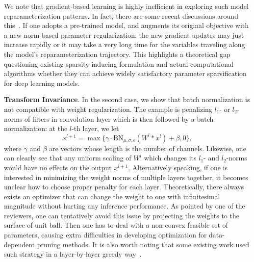 \documentclass{article} %
\begin{document}
We note that gradient-based learning is highly inefficient in exploring such model reparameterization 
patterns. In fact, there are some recent discussions around this~\citep{dinh2017sharp}. If one adopts a pre-trained model, and augments
its original objective with a new norm-based parameter regularization, the new gradient updates may just increase rapidly or 
it may take a very long time for the variables traveling along the model's reparameterization trajectory. 
This highlights a theoretical gap questioning existing sparsity-inducing formulation and actual
computational algorithms whether they can achieve widely satisfactory parameter sparsification
for deep learning models. 

\textbf{Transform Invariance}.
In the second case, we show that batch normalization is not compatible with weight regularization.
The example is penalizing
$l_1$- or $l_2$-norms of filters in convolution layer which is then followed by a batch normalization:
at the $l$-th layer, we let
\[x^{l+1} = \max\{\gamma \cdot \mbox{BN}_{\mu,\sigma,\epsilon}(W^{l} * x^{l}) + \beta, 0\}, \]
where $\gamma$ and $\beta$ are vectors whose length is the number of channels.
Likewise, one can clearly see that any uniform scaling of $W^{l}$ which changes its $l_1$- and $l_2$-norms would have no
effects on the output $x^{l+1}$. Alternatively speaking, 
if one is interested in minimizing the weight norms of multiple layers together,
it becomes unclear how to choose proper penalty for each layer. 
Theoretically, there always exists an optimizer that can change the weight to one with infinitesimal magnitude without
hurting any inference performance. As pointed by one of the reviewers, one can tentatively avoid this issue by projecting
the weights to the surface of unit ball. Then one has to deal with a non-convex feasible set of parameters, 
causing extra difficulties in developing optimization for data-dependent pruning methods.
It is also worth noting that some existing work
used such strategy in a layer-by-layer greedy way~\citep{he2017channel,zhang2016accelerating}.\\
\end{document}
